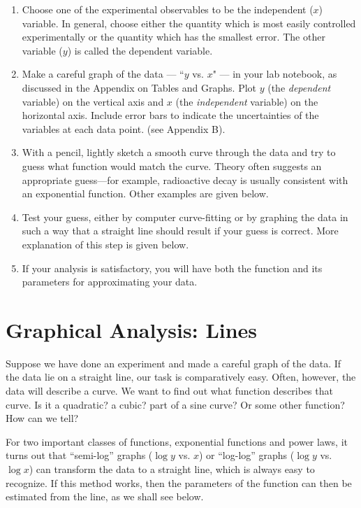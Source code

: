 \begin{enumerate}
\item Choose one of the experimental observables to be the
           independent ($x$) variable.  In general, choose either
           the quantity which is most easily controlled
           experimentally or the quantity which has the smallest
           error.  The other variable ($y$) is called the dependent
           variable.
	
\item Make a careful graph of the data --- ``$y$ vs. $x$" --- in your lab notebook, as
	discussed in the Appendix on Tables and Graphs.  Plot
	$y$ (the {\em dependent} variable) on the vertical axis and
$x$ (the
	{\em independent} variable) on the horizontal axis.  Include error
	bars to indicate the uncertainties of the variables at each data
	point.  (see Appendix B).

\item With a pencil, lightly sketch a smooth curve through the data
and try to guess what function would match the curve.  Theory often suggests
an appropriate guess---for example, radioactive decay is
usually consistent with an exponential function.  Other examples are
given below.

\item Test your guess, either by computer curve-fitting or by graphing the
    data in such a way that a straight line should result if your guess is
    correct.  More explanation of this step is given below.

\item If your analysis is satisfactory, you will have both the function and
    its parameters for approximating your data.
	
\end{enumerate}
\label{datanal}


\section*{Graphical Analysis: Lines}

Suppose we have done an experiment and made a careful graph of the data.  If
the data lie on a straight line, our task is comparatively easy.  Often,
however, the data will describe a curve.  We want to find out what function
describes that curve.  Is it a quadratic?  a cubic?  part of a sine
curve?  Or some other function?  How can we tell?

For two important classes of functions, exponential functions and power laws, it
turns out that ``semi-log'' graphs ($\log y$ vs. $x$) or ``log-log''
graphs ($\log
y$ vs. $\log x$) can transform the data to a straight line, which is
always
easy to recognize.  If this method works, then the parameters of the
function can then be estimated from the line, as we shall see below.

